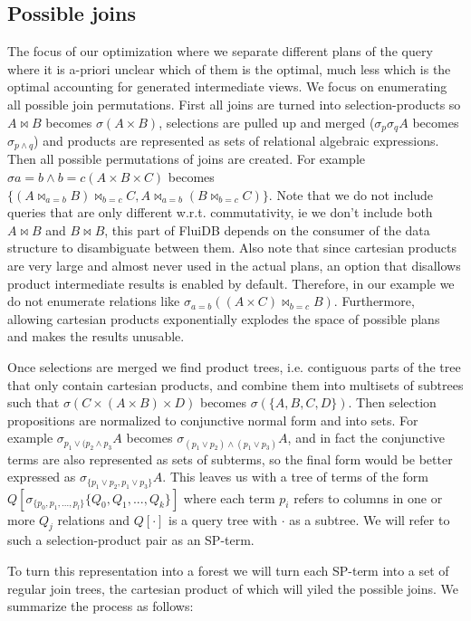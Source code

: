 \subsection{Possible joins}
\label{sec:org2eb887b}
The focus of our optimization where we separate different plans of the
query where it is a-priori unclear which of them is the optimal, much
less which is the optimal accounting for generated intermediate
views. We focus on enumerating all possible join permutations. First
all joins are turned into selection-products so \(A \Join B\)
becomes \(\sigma(A \times B)\), selections are pulled up and merged
(\(\sigma_p \sigma_q A\) becomes \(\sigma_{p \land q}\)) and
products are represented as sets of relational algebraic
expressions. Then all possible permutations of joins are created. For
example \(\sigma{a=b \land b=c}(A \times B \times C)\) becomes \(\{(A \Join_{a=b} B) \Join_{b=c} C, A \Join_{a=b} (B \Join_{b=c} C)\}\). Note that we do not include queries that are only different
w.r.t. commutativity, ie we don't include both \(A \Join B\) and \(B \Join B\), this part of FluiDB depends on the consumer of the data
structure to disambiguate between them. Also note that since cartesian
products are very large and almost never used in the actual plans, an
option that disallows product intermediate results is enabled by
default. Therefore, in our example we do not enumerate relations like
\(\sigma_{a=b}((A \times C) \Join_{b=c}B)\). Furthermore, allowing
cartesian products exponentially explodes the space of possible plans
and makes the results unusable.

Once selections are merged we find product trees, i.e. contiguous parts
of the tree that only contain cartesian products, and combine them
into multisets of subtrees such that \(\sigma(C \times (A \times B)
\times D)\) becomes \(\sigma(\{A,B,C,D\})\). Then selection propositions
are normalized to conjunctive normal form and into sets. For example
\(\sigma_{p_1 \lor (p_2 \land p_3}A\) becomes \(\sigma_{(p_1 \lor p_2)
  \land (p_1 \lor p_3)}A\), and in fact the conjunctive terms are also
represented as sets of subterms, so the final form would be better
expressed as \(\sigma_{\{p_1 \lor p_2,p_1 \lor p_3\}}A\). This leaves us
with a tree of terms of the form
\(Q[\sigma_{\{p_0,p_1,...,p_l\}}\{Q_0,Q_1,...,Q_k\}]\) where each term
\(p_i\) refers to columns in one or more \(Q_j\) relations and
\(Q[\cdot]\) is a query tree with \(\cdot\) as a subtree. We will
refer to such a selection-product pair as an SP-term.

To turn this representation into a forest we will turn each SP-term
into a set of regular join trees, the cartesian product of which will
yiled the possible joins. We summarize the process as follows:


